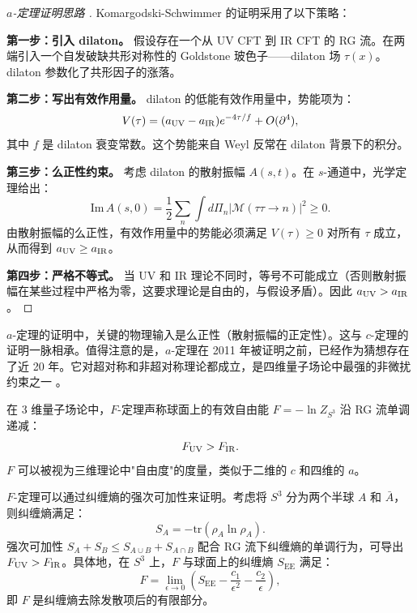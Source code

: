 \begin{proof}[$a$-定理证明思路 \cite{Komargodski2011}]
Komargodski-Schwimmer 的证明采用了以下策略：

\textbf{第一步：引入 dilaton。} 假设存在一个从 UV CFT 到 IR CFT 的 RG 流。在两端引入一个自发破缺共形对称性的 Goldstone 玻色子——dilaton 场 $\tau(x)$。dilaton 参数化了共形因子的涨落。

\textbf{第二步：写出有效作用量。} dilaton 的低能有效作用量中，势能项为：
\begin{equation}
    V(\tau) = (a_{\rm UV} - a_{\rm IR}) e^{-4\tau/f} + O(\partial^4),
\end{equation}
其中 $f$ 是 dilaton 衰变常数。这个势能来自 Weyl 反常在 dilaton 背景下的积分。

\textbf{第三步：么正性约束。} 考虑 dilaton 的散射振幅 $A(s,t)$。在 $s$-通道中，光学定理给出：
\begin{equation}
    \text{Im}\,A(s,0) = \frac{1}{2}\sum_n \int d\Pi_n |\mathcal{M}(\tau\tau \to n)|^2 \geq 0.
\end{equation}
由散射振幅的么正性，有效作用量中的势能必须满足 $V(\tau) \geq 0$ 对所有 $\tau$ 成立，从而得到 $a_{\rm UV} \geq a_{\rm IR}$。

\textbf{第四步：严格不等式。} 当 UV 和 IR 理论不同时，等号不可能成立（否则散射振幅在某些过程中严格为零，这要求理论是自由的，与假设矛盾）。因此 $a_{\rm UV} > a_{\rm IR}$。
\end{proof}

\begin{remark}
$a$-定理的证明中，关键的物理输入是么正性（散射振幅的正定性）。这与 $c$-定理的证明一脉相承。值得注意的是，$a$-定理在 2011 年被证明之前，已经作为猜想存在了近 20 年。它对超对称和非超对称理论都成立，是四维量子场论中最强的非微扰约束之一 \cite{Komargodski2011}。
\end{remark}

\begin{theorem}[$F$-定理]\label{thm:f-theorem}
在 3 维量子场论中，$F$-定理声称球面上的有效自由能 $F = -\ln Z_{S^3}$ 沿 RG 流单调递减：
\begin{equation}
    F_{\rm UV} > F_{\rm IR}.
\end{equation}
$F$ 可以被视为三维理论中"自由度"的度量，类似于二维的 $c$ 和四维的 $a$。
\end{theorem}

\begin{proposition}[三维 $F$-定理与纠缠熵的联系]\label{prop:f-theorem-ee}
$F$-定理可以通过纠缠熵的强次可加性来证明。考虑将 $S^3$ 分为两个半球 $A$ 和 $\bar{A}$，则纠缠熵满足：
\begin{equation}
    S_A = -\text{tr}(\rho_A \ln \rho_A).
\end{equation}
强次可加性 $S_A + S_B \leq S_{A\cup B} + S_{A\cap B}$ 配合 RG 流下纠缠熵的单调行为，可导出 $F_{\rm UV} > F_{\rm IR}$。具体地，在 $S^3$ 上，$F$ 与球面上的纠缠熵 $S_{\text{EE}}$ 满足：
\begin{equation}
    F = \lim_{\epsilon \to 0} \left(S_{\text{EE}} - \frac{c_1}{\epsilon^2} - \frac{c_2}{\epsilon}\right),
\end{equation}
即 $F$ 是纠缠熵去除发散项后的有限部分。
\end{proposition}

